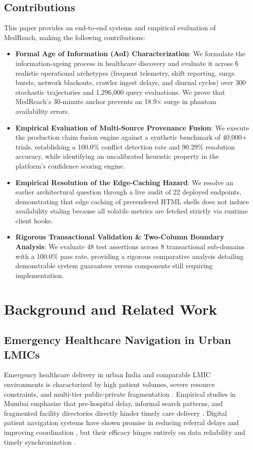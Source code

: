\documentclass[conference]{IEEEtran}
\begin{document}
\subsection{Contributions}
This paper provides an end-to-end systems and empirical evaluation of MedReach, making the following contributions:
\begin{itemize}
    \item \textbf{Formal Age of Information (AoI) Characterization}: We formulate the information-ageing process in healthcare discovery and evaluate it across 6 realistic operational archetypes (frequent telemetry, shift reporting, surge bursts, network blackouts, crawler ingest delays, and diurnal cycles) over 300 stochastic trajectories and 1,296,000 query evaluations. We prove that MedReach's 30-minute anchor prevents an 18.9$\times$ surge in phantom availability errors.
    \item \textbf{Empirical Evaluation of Multi-Source Provenance Fusion}: We execute the production claim fusion engine against a synthetic benchmark of 40,000+ trials, establishing a 100.0\% conflict detection rate and 90.29\% resolution accuracy, while identifying an uncalibrated heuristic property in the platform's confidence scoring engine.
    \item \textbf{Empirical Resolution of the Edge-Caching Hazard}: We resolve an earlier architectural question through a live audit of 22 deployed endpoints, demonstrating that edge caching of prerendered HTML shells does not induce availability staling because all volatile metrics are fetched strictly via runtime client hooks.
    \item \textbf{Rigorous Transactional Validation \& Two-Column Boundary Analysis}: We evaluate 48 test assertions across 8 transactional sub-domains with a 100.0\% pass rate, providing a rigorous comparative analysis detailing demonstrable system guarantees versus components still requiring implementation.
\end{itemize}

\section{Background and Related Work}

\subsection{Emergency Healthcare Navigation in Urban LMICs}
Emergency healthcare delivery in urban India and comparable LMIC environments is characterized by high patient volumes, severe resource constraints, and multi-tier public-private fragmentation \cite{naydenova2017healthcare,patil2016study}. Empirical studies in Mumbai emphasize that pre-hospital delay, informal search patterns, and fragmented facility directories directly hinder timely care delivery \cite{mukhopadhyay2018stroke,darapaneni2021predicting}. Digital patient navigation systems have shown promise in reducing referral delays and improving coordination \cite{metuge2026digital,sugira2026design,dalton2019patient}, but their efficacy hinges entirely on data reliability and timely synchronization \cite{chen2024patient}.
\end{document}
